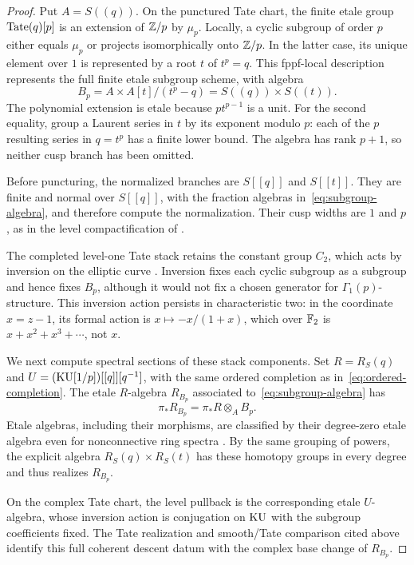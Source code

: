 \begin{proof}
Put $A=S((q))$. On the punctured Tate chart, the finite etale group
$\operatorname{Tate}(q)[p]$ is an extension of $\mathbb Z/p$ by $\mu_p$. Locally, a cyclic
subgroup of order $p$ either equals $\mu_p$ or projects isomorphically
onto $\mathbb Z/p$. In the latter case, its unique element over $1$ is
represented by a root $t$ of $t^p=q$. This fppf-local description
represents the full finite etale subgroup scheme, with algebra
\begin{equation}\label{eq:subgroup-algebra}
 B_p=A\times A[t]/(t^p-q)=S((q))\times S((t)).
\end{equation}
The polynomial extension is etale because $pt^{p-1}$ is a unit.
For the second equality, group a Laurent series in $t$ by its exponent
modulo $p$: each of the $p$ resulting series in $q=t^p$ has a finite
lower bound. The algebra has rank $p+1$, so neither cusp branch has
been omitted.

Before puncturing, the normalized branches are $S[[q]]$ and $S[[t]]$.
They are finite and normal over $S[[q]]$, with the fraction algebras
in~\eqref{eq:subgroup-algebra}, and therefore compute the normalization.
Their cusp widths are $1$ and $p$, as in the level compactification of
\cite[Proposition~3.19]{HL}.

The completed level-one Tate stack retains the constant group $C_2$,
which acts by inversion on the elliptic curve
\cite[Proposition~3.15]{HL}. Inversion fixes each cyclic subgroup as a
subgroup and hence fixes $B_p$, although it would not fix a chosen
generator for $\Gamma_1(p)$-structure. This inversion action persists
in characteristic two: in the coordinate $x=z-1$, its formal action
is $x\mapsto-x/(1+x)$, which over $\mathbb F_2$ is
$x+x^2+x^3+\cdots$, not $x$.

We next compute spectral sections of these stack components. Set
$R=R_S(q)$ and $U=(\mathrm{KU}[1/p])[[q]][q^{-1}]$, with the same ordered
completion as in~\eqref{eq:ordered-completion}. The etale $R$-algebra
$R_{B_p}$ associated to~\eqref{eq:subgroup-algebra} has
\[
 \pi_*R_{B_p}=\pi_*R\otimes_A B_p.
\]
Etale algebras, including their morphisms, are classified by their
degree-zero etale algebra even for nonconnective ring spectra
\cite[Theorem~2.12, Corollary~2.13 and Example~2.14]{MM}.
By the same grouping of powers, the explicit algebra
$R_S(q)\times R_S(t)$ has these homotopy groups in every degree
and thus realizes $R_{B_p}$.

On the complex Tate chart, the level pullback is the corresponding
etale $U$-algebra, whose inversion action is conjugation on $\mathrm{KU}$
with the subgroup coefficients fixed. The Tate realization and
smooth/Tate comparison cited above identify this full coherent descent
datum with the complex base change of $R_{B_p}$.


\end{proof}
